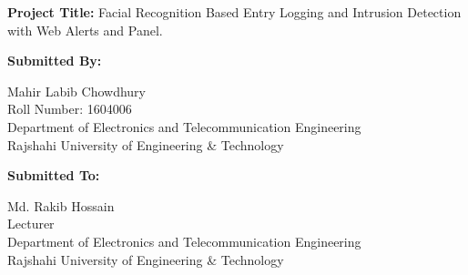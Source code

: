 \begin{titlepage}
\begin{center}
    \end{center}

    \begin{flushleft}
        \begin{Large}
            \textbf{Project Title:} Facial Recognition Based Entry Logging and Intrusion Detection with Web Alerts and Panel.\\
            \vspace{.5cm}
        \end{Large}
        \begin{large}
            \textbf{Submitted By:}\\
        \end{large}
        Mahir Labib Chowdhury\\
        Roll Number: 1604006\\
        Department of Electronics and Telecommunication Engineering\\
        Rajshahi University of Engineering \& Technology\\

        \vspace{.5cm}

        \begin{large}
            \textbf{Submitted To:}\\
        \end{large}
        Md. Rakib Hossain\\
        Lecturer\\
        Department of Electronics and Telecommunication Engineering\\
        Rajshahi University of Engineering \& Technology\\
    \end{flushleft}
\end{titlepage}